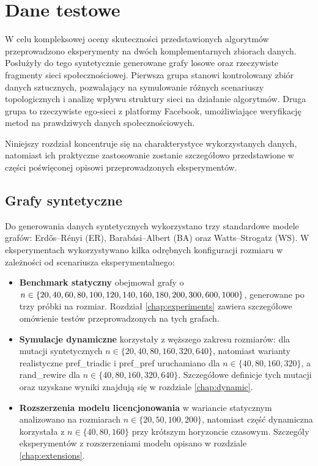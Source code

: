 \chapter{Dane testowe}\label{chap:testdata}

W celu kompleksowej oceny skuteczności przedstawionych algorytmów przeprowadzono eksperymenty na dwóch komplementarnych zbiorach danych. Posłużyły do tego syntetycznie generowane grafy losowe oraz rzeczywiste fragmenty sieci społecznościowej. Pierwsza grupa stanowi kontrolowany zbiór danych sztucznych, pozwalający na symulowanie różnych scenariuszy topologicznych i analizę wpływu struktury sieci na działanie algorytmów. Druga grupa to rzeczywiste ego-sieci z platformy Facebook, umożliwiające weryfikację metod na prawdziwych danych społecznościowych.

Niniejszy rozdział koncentruje się na charakterystyce wykorzystanych danych, natomiast ich praktyczne zastosowanie zostanie szczegółowo przedstawione w części poświęconej opisowi przeprowadzonych eksperymentów.

\section{Grafy syntetyczne}

Do generowania danych syntetycznych wykorzystano trzy standardowe modele grafów: Erd\H{o}s--Rényi (ER), Barabási--Albert (BA) oraz Watts--Strogatz (WS).
W eksperymentach wykorzystywano kilka odrębnych konfiguracji rozmiaru w zależności od scenariusza eksperymentalnego:
\begin{itemize}
    \item \textbf{Benchmark statyczny} obejmował grafy o $n \in \{20, 40, 60, 80, 100, 120, 140, 160, 180,\\200, 300, 600, 1000\}$, generowane po trzy próbki na rozmiar. Rozdział \ref{chap:experiments} zawiera szczegółowe omówienie testów przeprowadzonych na tych grafach.
    \item \textbf{Symulacje dynamiczne} korzystały z węższego zakresu rozmiarów: dla mutacji syntetycznych $n \in \{20, 40, 80, 160, 320, 640\}$, natomiast warianty realistyczne pref\_triadic i pref\_pref uruchamiano dla $n\in\{40,80,160,320\}$, a rand\_rewire dla $n\in\{40,80,160,320,640\}$. Szczegółowe definicje tych mutacji oraz uzyskane wyniki znajdują się w rozdziale \ref{chap:dynamic}.
    \item \textbf{Rozszerzenia modelu licencjonowania} w wariancie statycznym analizowano na rozmiarach $n \in \{20, 50, 100, 200\}$, natomiast część dynamiczna korzystała z $n \in \{40, 80, 160\}$ przy krótszym horyzoncie czasowym. Szczegóły eksperymentów z rozszerzeniami modelu opisano w rozdziale \ref{chap:extensions}.
\end{itemize}

